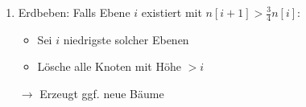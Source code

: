\begin{itemize}
\begin{enumerate}
      \item Erdbeben: Falls Ebene $i$ existiert mit $n[i+1] > \frac{3}{4} n[i]$: 
          \begin{itemize}
          \item Sei $i$ niedrigste solcher Ebenen
          \item Lösche alle Knoten mit Höhe $> i$
          \end{itemize}
          $\rightarrow$ Erzeugt ggf. neue Bäume
     \end{enumerate}
\end{itemize}


